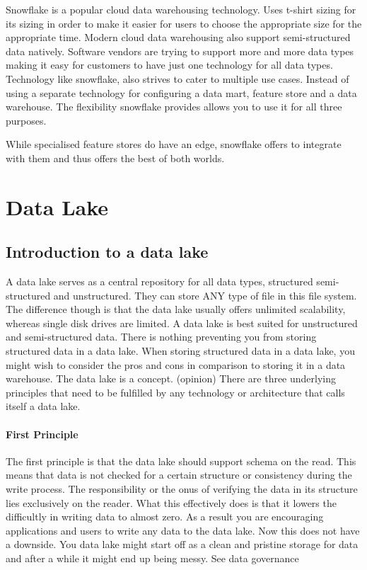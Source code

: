\documentclass[a4paper, 11pt]{article}
\begin{document}
    Snowflake is a popular cloud data warehousing technology.
    Uses t-shirt sizing for its sizing in order to make it easier for users to choose the appropriate size for the appropriate time.
    Modern cloud data warehousing also support semi-structured data natively.
    Software vendors are trying to support more and more data types making it easy for customers to have just one technology for all data types.
    Technology like snowflake, also strives to cater to multiple use cases.
    Instead of using a separate technology for configuring a data mart, feature store and a data warehouse.
    The flexibility snowflake provides allows you to use it for all three purposes.

    While specialised feature stores do have an edge, snowflake offers to integrate with them and thus offers the best of both worlds.


    \section{Data Lake}

    \subsection{Introduction to a data lake}
    A data lake serves as a central repository for all data types, structured semi-structured and unstructured.
    They can store ANY type of file in this file system.
    The difference though is that the data lake usually offers unlimited scalability, whereas single disk drives are limited.
    A data lake is best suited for unstructured and semi-structured data.
    There is nothing preventing you from storing structured data in a data lake.
    When storing structured data in a data lake, you might wish to consider the pros and cons in comparison to storing it in a data warehouse.
    The data lake is a concept.
    (opinion) There are three underlying principles that need to be fulfilled by any technology or architecture that calls itself a data lake.

    \paragraph{First Principle}
    The first principle is that the data lake should support schema on the read.
    This means that data is not checked for a certain structure or consistency during the write process.
    The responsibility or the onus of verifying the data in its structure lies exclusively on the reader.
    What this effectively does is that it lowers the difficultly in writing data to almost zero.
    As a result you are encouraging applications and users to write any data to the data lake. %
    Now this does not have a downside.
    You data lake might start off as a clean and pristine storage for data and after a while it might end up being messy.
    See data governance
\end{document}

